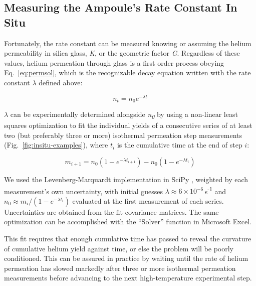 \subsection{Measuring the Ampoule's Rate Constant In Situ}\label{in-situ-rate-constant}

Fortunately, the rate constant can be measured knowing or assuming the helium permeability in silica glass, \emph{K}, or the geometric factor \emph{G}. Regardless of these values, helium permeation through glass is a first order process obeying Eq.~\eqref{eq:permsol}, which is the recognizable decay equation written with the rate constant \(\lambda\) defined above:

\begin{equation}
\label{eq:decay}
n_{t} = n_{0}e^{- \lambda t}
\end{equation}

\(\lambda\) can be experimentally determined alongside \emph{n\textsubscript{0}} by using a non-linear least squares optimization to fit the individual yields of a consecutive series of at least two (but preferably three or more) isothermal permeation step measurements (Fig.~\ref{fig:insitu-examples}), where \(t_i\) is the cumulative time at the end of step \(i\):

\begin{equation}
\label{eq:incyield}
m_{i + 1} = n_{0}\left( 1 - e^{- \lambda t_{i + 1}} \right) - n_{0}\left( 1 - e^{- \lambda t_{i}} \right)
\end{equation}

We used the Levenberg-Marquardt implementation in SciPy \citep{virtanen2020}, weighted by each measurement's own uncertainty, with initial guesses \(\lambda \approx 6\times10^{-6}\)\,s\textsuperscript{-1} and \(n_{0} \approx m_{i}/\left( 1 - e^{- \lambda t_{i}} \right)\) evaluated at the first measurement of each series. Uncertainties are obtained from the fit covariance matrices. The same optimization can be accomplished with the ``Solver'' function in Microsoft Excel.

This fit requires that enough cumulative time has passed to reveal the curvature of cumulative helium yield against time, or else the problem will be poorly conditioned. This can be assured in practice by waiting until the rate of helium permeation has slowed markedly after three or more isothermal permeation measurements before advancing to the next high-temperature experimental step. 

